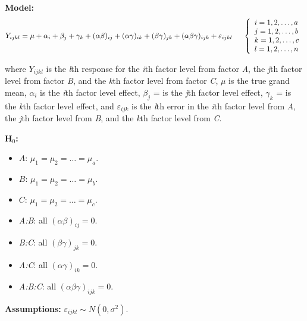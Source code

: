 \documentclass[12pt,english]{article}\usepackage[]{graphicx}\usepackage[table]{xcolor}
\begin{document}
\textbf{Model:} \[Y_{ijkl} = \mu + \alpha_i + \beta_j + \gamma_k + (\alpha\beta)_{ij} + (\alpha\gamma)_{ik} + (\beta\gamma)_{jk} +  (\alpha\beta\gamma)_{ijk} + \varepsilon_{ijkl} \hspace{0.2in} \left\{
                \begin{array}{ll}
                  i = 1,2,\dots,a\\
                  j = 1,2,\dots,b\\
                  k = 1,2,\dots,c \\
                  l = 1,2,\dots,n \\
                \end{array}
              \right.\]


\noindent where $Y_{ijkl}$ is the \textit{l}th response for the \textit{i}th factor level from factor \textit{A}, the \textit{j}th factor level from factor \textit{B}, and the \textit{k}th factor level from factor \textit{C}, $\mu$ is the true grand mean, $\alpha_i$ is the \textit{i}th factor level effect, $\beta_j$ = is the \textit{j}th factor level effect, $\gamma_k$ = is the \textit{k}th factor level effect, and $\varepsilon_{ijk}$ is the \textit{l}th error in the \textit{i}th factor level from \textit{A}, the \textit{j}th factor level from \textit{B}, and the \textit{k}th factor level from \textit{C}. \\
\vspace{0.05in}

\noindent \textbf{H$_0$:}
\begin{itemize}
\item $A$: $\mu_1 = \mu_2 = \dots = \mu_a$.
\item $B$: $\mu_1 = \mu_2 = \dots = \mu_b$.
\item $C$: $\mu_1 = \mu_2 = \dots = \mu_c$.
\item \textit{A:B}: all $(\alpha\beta)_{ij} = 0$.
\item \textit{B:C}: all $(\beta\gamma)_{jk} = 0$.
\item \textit{A:C}: all $(\alpha\gamma)_{ik} = 0$.
\item \textit{A:B:C}: all $(\alpha\beta\gamma)_{ijk} = 0$.
\end{itemize}
\vspace{0.1in}

\noindent \textbf{Assumptions:} $\varepsilon_{ijkl} \sim N(0, \sigma^2)$.
\vspace{0.1in}
\end{document}
